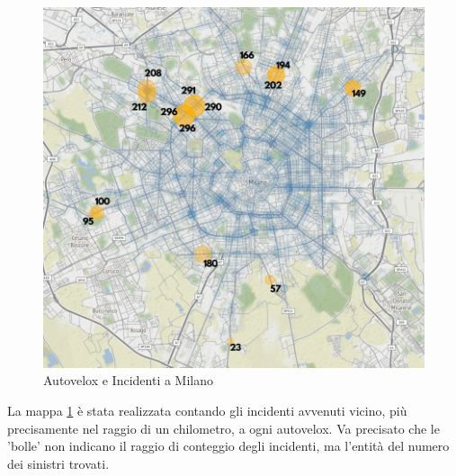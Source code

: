 \documentclass[a4paper]{report}
\begin{document}
\begin{figure}
    \includegraphics[width=\linewidth]{../src/autovelox/correlazione.png}
    \caption{Autovelox e Incidenti a Milano}
    \label{fig:autovelox-incidenti}
\end{figure}

La mappa \ref{fig:autovelox-incidenti} è stata realizzata contando gli incidenti avvenuti 
vicino, più precisamente nel raggio di un chilometro, a ogni autovelox.
Va precisato che le 'bolle' non indicano il raggio di conteggio degli incidenti, ma 
l'entità del numero dei sinistri trovati.
\end{document}
